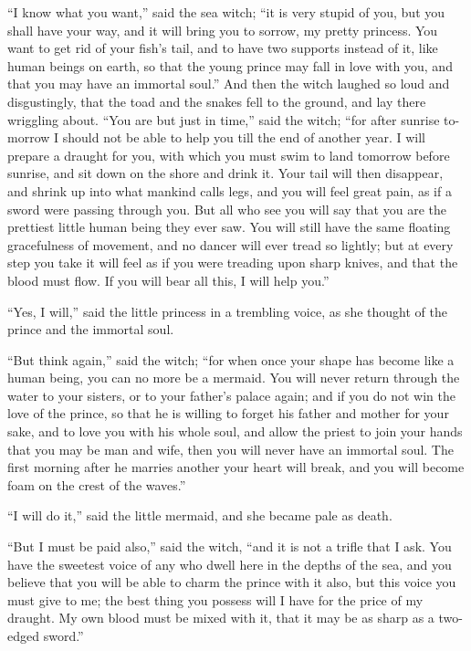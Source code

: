 ``I know what you want,'' said the sea witch; ``it is very stupid of you, but you shall have your way, and it will bring you to sorrow, my pretty princess.
You want to get rid of your fish’s tail, and to have two supports instead of it, like human beings on earth, so that the young prince may fall in love with you, and that you may have an immortal soul.'' And then the witch laughed so loud and disgustingly, that the toad and the snakes fell to the ground, and lay there wriggling about.
``You are but just in time,'' said the witch; ``for after sunrise to-morrow I should not be able to help you till the end of another year.
I will prepare a draught for you, with which you must swim to land tomorrow before sunrise, and sit down on the shore and drink it.
Your tail will then disappear, and shrink up into what mankind calls legs, and you will feel great pain, as if a sword were passing through you.
But all who see you will say that you are the prettiest little human being they ever saw.
You will still have the same floating gracefulness of movement, and no dancer will ever tread so lightly; but at every step you take it will feel as if you were treading upon sharp knives, and that the blood must flow.
If you will bear all this, I will help you.''

``Yes, I will,'' said the little princess in a trembling voice, as she thought of the prince and the immortal soul.

``But think again,'' said the witch; ``for when once your shape has become like a human being, you can no more be a mermaid.
You will never return through the water to your sisters, or to your father’s palace again; and if you do not win the love of the prince, so that he is willing to forget his father and mother for your sake, and to love you with his whole soul, and allow the priest to join your hands that you may be man and wife, then you will never have an immortal soul.
The first morning after he marries another your heart will break, and you will become foam on the crest of the waves.''

``I will do it,'' said the little mermaid, and she became pale as death.

``But I must be paid also,'' said the witch, ``and it is not a trifle that I ask.
You have the sweetest voice of any who dwell here in the depths of the sea, and you believe that you will be able to charm the prince with it also, but this voice you must give to me; the best thing you possess will I have for the price of my draught.
My own blood must be mixed with it, that it may be as sharp as a two-edged sword.''

